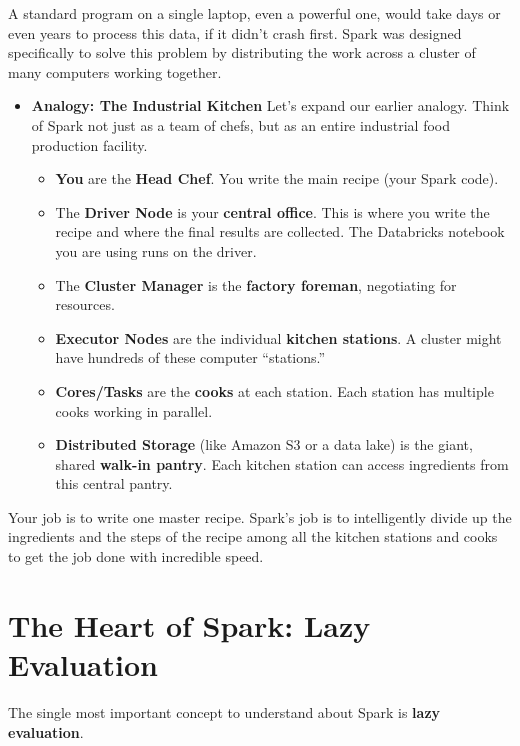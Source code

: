 \documentclass[
  letterpaper,
  DIV=11,
  numbers=noendperiod]{scrreprt}
\providecommand{\tightlist}{%
  \setlength{\itemsep}{0pt}\setlength{\parskip}{0pt}}
\begin{document}
A standard program on a single laptop, even a powerful one, would take
days or even years to process this data, if it didn't crash first. Spark
was designed specifically to solve this problem by distributing the work
across a cluster of many computers working together.

\begin{itemize}
\tightlist
\item
  \textbf{Analogy: The Industrial Kitchen} Let's expand our earlier
  analogy. Think of Spark not just as a team of chefs, but as an entire
  industrial food production facility.

  \begin{itemize}
  \tightlist
  \item
    \textbf{You} are the \textbf{Head Chef}. You write the main recipe
    (your Spark code).
  \item
    The \textbf{Driver Node} is your \textbf{central office}. This is
    where you write the recipe and where the final results are
    collected. The Databricks notebook you are using runs on the driver.
  \item
    The \textbf{Cluster Manager} is the \textbf{factory foreman},
    negotiating for resources.
  \item
    \textbf{Executor Nodes} are the individual \textbf{kitchen
    stations}. A cluster might have hundreds of these computer
    ``stations.''
  \item
    \textbf{Cores/Tasks} are the \textbf{cooks} at each station. Each
    station has multiple cooks working in parallel.
  \item
    \textbf{Distributed Storage} (like Amazon S3 or a data lake) is the
    giant, shared \textbf{walk-in pantry}. Each kitchen station can
    access ingredients from this central pantry.
  \end{itemize}
\end{itemize}

Your job is to write one master recipe. Spark's job is to intelligently
divide up the ingredients and the steps of the recipe among all the
kitchen stations and cooks to get the job done with incredible speed.

\section{The Heart of Spark: Lazy
Evaluation}\label{the-heart-of-spark-lazy-evaluation}

The single most important concept to understand about Spark is
\textbf{lazy evaluation}.
\end{document}
